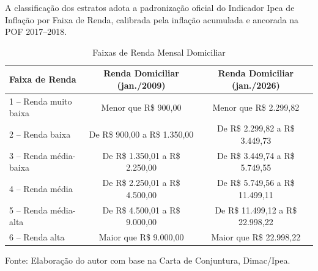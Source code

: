 \documentclass[10pt,a4paper]{article}
\begin{document}
	\vspace{0.06cm}
	
	{\small A classificação dos estratos adota a padronização oficial do Indicador Ipea de Inflação por Faixa de Renda, calibrada pela inflação acumulada e ancorada na POF 2017--2018.}
	
	\vspace{0.04cm}
	
	\begin{table}[h!]
		\centering
		\caption{Faixas de Renda Mensal Domiciliar}
		\vspace{2pt}
		\footnotesize
		\begin{tabular*}{\textwidth}{@{\extracolsep{\fill}} l c c @{}}
			\toprule
			\textbf{Faixa de Renda} & \textbf{Renda Domiciliar (jan./2009)} & \textbf{Renda Domiciliar (jan./2026)} \\
			\midrule
			
			1 -- Renda muito baixa & Menor que R\$ 900,00 & Menor que R\$ 2.299,82 \\
			
			2 -- Renda baixa & De R\$ 900,00 a R\$ 1.350,00 & De R\$ 2.299,82 a R\$ 3.449,73 \\
			
			3 -- Renda média-baixa & De R\$ 1.350,01 a R\$ 2.250,00 & De R\$ 3.449,74 a R\$ 5.749,55 \\
			
			4 -- Renda média & De R\$ 2.250,01 a R\$ 4.500,00 & De R\$ 5.749,56 a R\$ 11.499,11 \\
			
			5 -- Renda média-alta & De R\$ 4.500,01 a R\$ 9.000,00 & De R\$ 11.499,12 a R\$ 22.998,22 \\
			
			6 -- Renda alta & Maior que R\$ 9.000,00 & Maior que R\$ 22.998,22 \\
			
			\bottomrule
		\end{tabular*}
		\vspace{2pt}
		\noindent\raggedright
		{\tiny \color{secondary} Fonte: Elaboração do autor com base na Carta de Conjuntura, Dimac/Ipea.}
	\end{table}
	
	\vspace*{\fill}
	
	\vspace{0.06cm}
	
\end{document}
